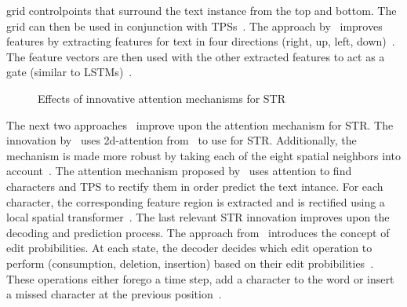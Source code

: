 grid controlpoints that surround the text instance from the top and bottom.
The grid can then be used in conjunction with \acp{TPS}~\citep{shi_aster_2019}.
The approach by~\cite{cheng_aon_2018} improves features by extracting features for text in
four directions (right, up, left, down)~\citep{cheng_aon_2018}.
The feature vectors are then used with the other extracted features to act as a gate (similar to
\acp{LSTM})~\citep{cheng_aon_2018}.
\begin{figure}[ht]
    \centering\scriptsize
    \caption{%
        Effects of innovative attention mechanisms for STR\label{fig:attention-examples}
    }
\end{figure}
The next two approaches~\citep{li_show_2019,liu_char-net_2018} improve upon the attention mechanism
for \ac{STR}.
The innovation by~\cite{li_show_2019} uses 2d-attention from~\citep{xu_show_2016} to use
for \ac{STR}.
Additionally, the mechanism is made more robust by taking each of the eight spatial neighbors into
account~\citep{li_show_2019}.
The attention mechanism proposed by~\cite{liu_char-net_2018} uses attention to find characters and
\ac{TPS} to rectify them in order predict the text intance.
For each character, the corresponding feature region is extracted and is
rectified using a local spatial transformer~\citep{liu_char-net_2018}.
The last relevant \ac{STR} innovation improves upon the decoding and prediction process.
The approach from~\cite{bai_edit_2018} introduces the concept of edit probibilities.
At each state, the decoder decides which edit operation to perform (consumption, deletion, insertion)
based on their edit probibilities~\citep{bai_edit_2018}.
These operations either forego a time step, add a character to the word or insert a missed character
at the previous position~\citep{bai_edit_2018}.

